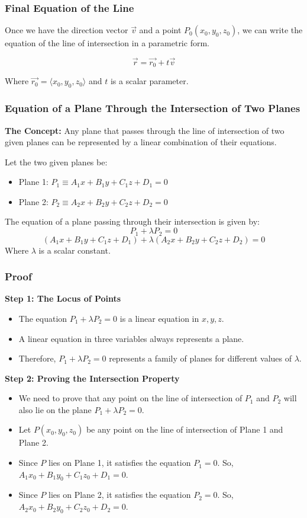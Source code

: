 \begin{frame}
    \frametitle{Final Equation of the Line}
    Once we have the direction vector $\vec{v}$ and a point $P_0(x_0, y_0, z_0)$, we can write the equation of the line of intersection in a parametric form.
    
    $$\vec{r} = \vec{r_0} + t\vec{v}$$
    
    Where $\vec{r_0} = \langle x_0, y_0, z_0 \rangle$ and $t$ is a scalar parameter.
\end{frame}

\begin{frame}
    \frametitle{Equation of a Plane Through the Intersection of Two Planes}
    \textbf{The Concept:} Any plane that passes through the line of intersection of two given planes can be represented by a linear combination of their equations.
    
    Let the two given planes be:
    \begin{itemize}
        \item Plane 1: $P_1 \equiv A_1x + B_1y + C_1z + D_1 = 0$
        \item Plane 2: $P_2 \equiv A_2x + B_2y + C_2z + D_2 = 0$
    \end{itemize}
    The equation of a plane passing through their intersection is given by:
    $$P_1 + \lambda P_2 = 0$$
    $$(A_1x + B_1y + C_1z + D_1) + \lambda(A_2x + B_2y + C_2z + D_2) = 0$$
    Where $\lambda$ is a scalar constant.
\end{frame}

\begin{frame}
    \frametitle{Proof}
    \textbf{Step 1: The Locus of Points}
    \begin{itemize}
        \item The equation $P_1 + \lambda P_2 = 0$ is a linear equation in $x, y, z$.
        \item A linear equation in three variables always represents a plane.
        \item Therefore, $P_1 + \lambda P_2 = 0$ represents a family of planes for different values of $\lambda$.
    \end{itemize}

    \textbf{Step 2: Proving the Intersection Property}
    \begin{itemize}
        \item We need to prove that any point on the line of intersection of $P_1$ and $P_2$ will also lie on the plane $P_1 + \lambda P_2 = 0$.
        \item Let $P(x_0, y_0, z_0)$ be any point on the line of intersection of Plane 1 and Plane 2.
        \item Since $P$ lies on Plane 1, it satisfies the equation $P_1 = 0$. So, $A_1x_0 + B_1y_0 + C_1z_0 + D_1 = 0$.
        \item Since $P$ lies on Plane 2, it satisfies the equation $P_2 = 0$. So, $A_2x_0 + B_2y_0 + C_2z_0 + D_2 = 0$.
    \end{itemize}
\end{frame}

